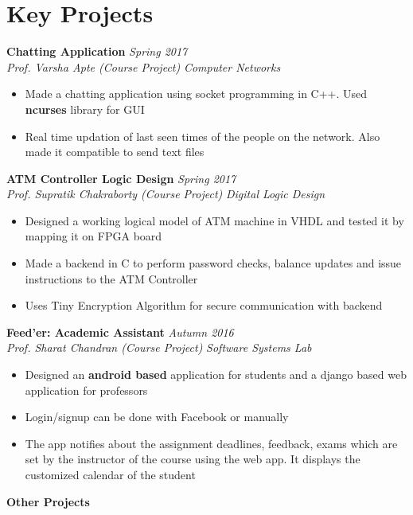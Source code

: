 \documentclass[a4paper,10pt]{article}
\begin{document}
\section{Key Projects}
\textbf{Chatting Application} \hfill \textit{Spring 2017}\\
\textit{Prof. Varsha Apte (Course Project)} \hfill \textit{Computer Networks}
\begin{itemize}
    \item Made a chatting application using socket programming in C++. Used \textbf{ncurses} library for GUI
    \item Real time updation of last seen times of the people on the network. Also made it compatible to send text files
\end{itemize}
\textbf{ATM Controller Logic Design} \hfill \textit{Spring 2017}\\
\textit{Prof. Supratik Chakraborty (Course Project)} \hfill \textit{Digital Logic Design}
\begin{itemize}
    \item Designed a working logical model of ATM machine in VHDL and tested it by mapping it on FPGA board
    \item Made a backend in C to perform password checks, balance updates and issue instructions to the ATM Controller
    \item Uses Tiny Encryption Algorithm for secure communication with backend
\end{itemize}
\textbf{Feed’er: Academic Assistant} \hfill \textit{Autumn 2016}\\
\textit{Prof. Sharat Chandran (Course Project)} \hfill \textit{Software Systems Lab}
\begin{itemize}
    \item Designed an \textbf{android based} application for students and a django based web application for professors
    \item Login/signup can be done with Facebook or manually
    \item The app notifies about the assignment deadlines, feedback, exams which are set by the instructor of the course using the web app. It displays the customized calendar of the student
\end{itemize}
\textbf{Other Projects}
\end{document}
